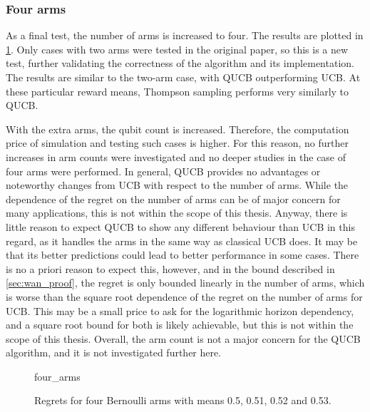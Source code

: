 \clearpage

\subsubsection{Four arms}
As a final test, the number of arms is increased to four.
The results are plotted in \cref{fig:four_arms}.
Only cases with two arms were tested in the original paper, so this is a new test, further validating the correctness of the algorithm and its implementation.
The results are similar to the two-arm case, with QUCB outperforming UCB.
At these particular reward means, Thompson sampling performs very similarly to QUCB.


With the extra arms, the qubit count is increased.
Therefore, the computation price of simulation and testing such cases is higher.
For this reason, no further increases in arm counts were investigated and no deeper studies in the case of four arms were performed.
In general, QUCB provides no advantages or noteworthy changes from UCB with respect to the number of arms.
While the dependence of the regret on the number of arms can be of major concern for many applications, this is not within the scope of this thesis.
Anyway, there is little reason to expect QUCB to show any different behaviour than UCB in this regard, as it handles the arms in the same way as classical UCB does.
It may be that its better predictions could lead to better performance in some cases.
There is no a priori reason to expect this, however, and in the bound described in \cref{sec:wan_proof}, the regret is only bounded linearly in the number of arms, which is worse than the square root dependence of the regret on the number of arms for UCB.
This may be a small price to ask for the logarithmic horizon dependency, and a square root bound for both is likely achievable, but this is not within the scope of this thesis.
Overall, the arm count is not a major concern for the QUCB algorithm, and it is not investigated further here.

\begin{figure}[p]
    \centering
    \newcommand{\myoptions}{
        width=10cm,
        height=8cm,
        xlabel={Kiloturn},
        ylabel={Regret},
        legend entries={UCB, QUCB, Thompson},
        legend pos=north west,
        legend cell align=left,
        mystyle,
    }
    {four_arms}
    \caption[
        Regrets for four Bernoulli arms.
    ]
    {
        Regrets for four Bernoulli arms with means 0.5, 0.51, 0.52 and 0.53.
    }
    \label{fig:four_arms}
\end{figure}

